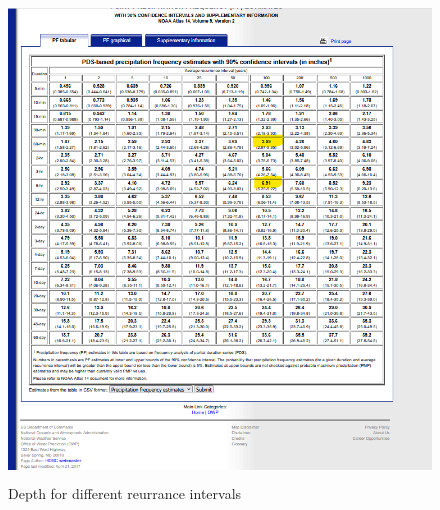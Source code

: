 \documentclass[12pt]{article}
\begin{document}
\begin{enumerate}
\begin{figure}[h!] %
   \centering
   \includegraphics[height=5in]{pfds-2.png} 
   \caption{Depth for different reurrance intervals}
   \label{fig:pfds-2}
\end{figure}


\end{enumerate}
\end{document}
